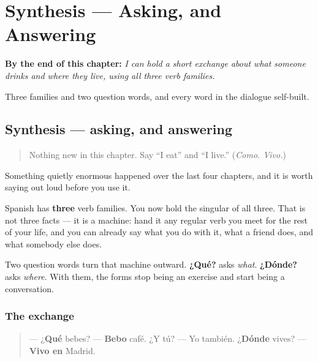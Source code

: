 
\chapter{Synthesis --- Asking, and Answering}
\label{ch:spanish-synthesis-three-families}

\begin{chapteropening}
\textbf{By the end of this chapter:} \emph{I can hold a short exchange about what someone drinks and where they live, using all three verb families.}

Three families and two question words, and every word in the dialogue self-built.
\end{chapteropening}

\section[Practice]{Synthesis — asking, and answering}

\label{lesson:ES-C07-sintesis-preguntar}



\begin{quote}
Nothing new in this chapter. Say \textquotedblleft{}I eat\textquotedblright{} and \textquotedblleft{}I live.\textquotedblright{} (\emph{Como. Vivo.})
\end{quote}

\begin{grammarlens}[title={What you've built}]
Something quietly enormous happened over the last four chapters, and it is worth saying out loud before you use it.

Spanish has \textbf{three} verb families. You now hold the singular of all three. That is not three facts — it is a machine: hand it any regular verb you meet for the rest of your life, and you can already say what you do with it, what a friend does, and what somebody else does.

Two question words turn that machine outward. \textbf{¿Qué?} asks \emph{what}. \textbf{¿Dónde?} asks \emph{where}. With them, the forms stop being an exercise and start being a conversation.
\end{grammarlens}

\subsection*{The exchange}
\begin{quote}
— ¿\textbf{Qué} bebes? — \textbf{Bebo} café. ¿Y tú? — Yo también. ¿\textbf{Dónde} vives? — \textbf{Vivo en} Madrid.
\end{quote}

